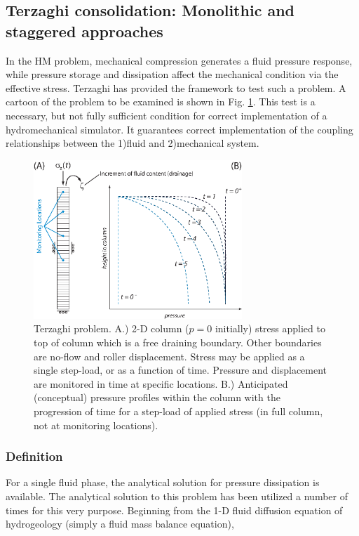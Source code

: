 \subsection{Terzaghi consolidation: Monolithic and staggered approaches}

In the HM problem, mechanical compression generates a fluid pressure response, while pressure storage and dissipation affect the mechanical condition via the effective stress. Terzaghi has provided the framework to test such a problem. A cartoon of the problem to be examined is shown in Fig. \ref{terz:cartoon}. This test is a necessary, but not fully sufficient condition for correct implementation of a hydromechanical simulator. It guarantees correct implementation of the coupling relationships between the 1)fluid and 2)mechanical system.

\begin{figure}[!tbh]
\begin{center}
\includegraphics[width=0.7\textwidth]{chapter_14/figures/fig_14_1_1}
\end{center}
\caption{Terzaghi problem. A.) 2-D column ($p=0$ initially) stress applied to top of column which is a free draining boundary. Other boundaries are no-flow and roller displacement. Stress may be applied as a single step-load, or as a function of time. Pressure and displacement are monitored in time at specific locations. B.) Anticipated (conceptual) pressure profiles within the column with the progression of time for a step-load of applied stress (in full column, not at monitoring locations).}
\label{terz:cartoon}
\end{figure}

\subsubsection*{Definition}
For a single fluid phase, the analytical solution for pressure dissipation is available.  The analytical solution to this problem has been utilized a number of times for this very purpose. Beginning from the 1-D fluid diffusion equation of hydrogeology (simply a fluid mass balance equation),

